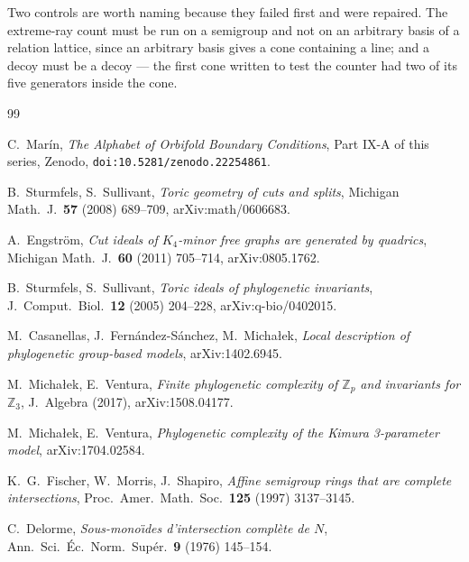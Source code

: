 \documentclass[11pt,a4paper]{article}
\theoremstyle{definition}
\newcommand{\ZZ}{\mathbb{Z}}
\begin{document}
\medskip\noindent
Two controls are worth naming because they failed first and were repaired. The extreme-ray count
must be run on a semigroup and not on an arbitrary basis of a relation lattice, since an arbitrary
basis gives a cone containing a line; and a decoy must be a decoy --- the first cone written to test
the counter had two of its five generators inside the cone.

\begin{thebibliography}{99}

 C.~Mar\'in, \emph{The Alphabet of Orbifold Boundary Conditions}, Part IX-A of this
series, Zenodo, \texttt{doi:10.5281/zenodo.22254861}.

 B.~Sturmfels, S.~Sullivant, \emph{Toric geometry of cuts and splits}, Michigan
Math.\ J.\ \textbf{57} (2008) 689--709, arXiv:math/0606683. %

 A.~Engstr\"om, \emph{Cut ideals of $K_4$-minor free graphs are generated by
quadrics}, Michigan Math.\ J.\ \textbf{60} (2011) 705--714, arXiv:0805.1762. %

 B.~Sturmfels, S.~Sullivant, \emph{Toric ideals of phylogenetic invariants},
J.\ Comput.\ Biol.\ \textbf{12} (2005) 204--228, arXiv:q-bio/0402015. %

 M.~Casanellas, J.~Fern\'andez-S\'anchez, M.~Micha{\l}ek, \emph{Local description of
phylogenetic group-based models}, arXiv:1402.6945. %

 M.~Micha{\l}ek, E.~Ventura, \emph{Finite phylogenetic complexity of $\ZZ_p$ and
invariants for $\ZZ_3$}, J.\ Algebra (2017), arXiv:1508.04177.

 M.~Micha{\l}ek, E.~Ventura, \emph{Phylogenetic complexity of the Kimura
3-parameter model}, arXiv:1704.02584.

 K.~G.~Fischer, W.~Morris, J.~Shapiro, \emph{Affine semigroup rings that are complete
intersections}, Proc.\ Amer.\ Math.\ Soc.\ \textbf{125} (1997) 3137--3145. %

 C.~Delorme, \emph{Sous-mono\"\i des d'intersection compl\`ete de $N$}, Ann.\ Sci.\
\'Ec.\ Norm.\ Sup\'er.\ \textbf{9} (1976) 145--154. %


\end{thebibliography}
\end{document}
